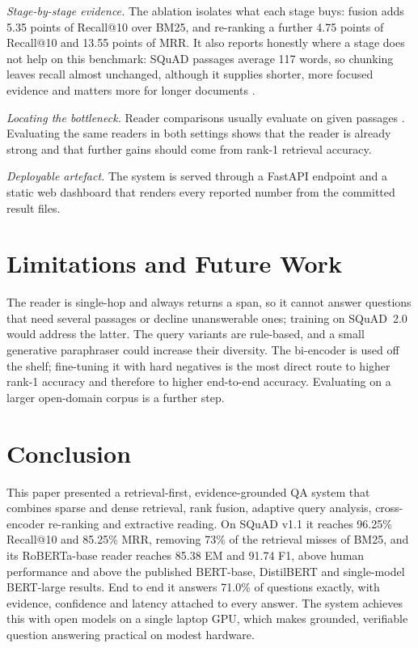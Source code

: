 \documentclass[conference]{IEEEtran}
\begin{document}
\emph{Stage-by-stage evidence.} The ablation isolates what each stage buys: fusion adds 5.35
points of Recall@10 over BM25, and re-ranking a further 4.75 points of Recall@10 and 13.55 points
of MRR. It also reports honestly where a stage does not help on this benchmark: SQuAD passages
average 117 words, so chunking leaves recall almost unchanged, although it supplies shorter,
more focused evidence and matters more for longer documents \cite{dang2021,tan2025}.

\emph{Locating the bottleneck.} Reader comparisons usually evaluate on given passages
\cite{sinthusha2025}. Evaluating the same readers in both settings shows that the reader is
already strong and that further gains should come from rank-1 retrieval accuracy.

\emph{Deployable artefact.} The system is served through a FastAPI endpoint and a static web
dashboard that renders every reported number from the committed result files.

\section{Limitations and Future Work}

The reader is single-hop and always returns a span, so it cannot answer questions that need
several passages or decline unanswerable ones; training on SQuAD~2.0 would address the latter.
The query variants are rule-based, and a small generative paraphraser could increase their
diversity. The bi-encoder is used off the shelf; fine-tuning it with hard negatives
\cite{choi2021,karpukhin2020} is the most direct route to higher rank-1 accuracy and therefore to
higher end-to-end accuracy. Evaluating on a larger open-domain corpus is a further step.

\section{Conclusion}

This paper presented a retrieval-first, evidence-grounded QA system that combines sparse and
dense retrieval, rank fusion, adaptive query analysis, cross-encoder re-ranking and extractive
reading. On SQuAD v1.1 it reaches 96.25\% Recall@10 and 85.25\% MRR, removing 73\% of the
retrieval misses of BM25, and its RoBERTa-base reader reaches 85.38 EM and 91.74 F1, above human
performance and above the published BERT-base, DistilBERT and single-model BERT-large results.
End to end it answers 71.0\% of questions exactly, with evidence, confidence and latency
attached to every answer. The system achieves this with open models on a single laptop GPU,
which makes grounded, verifiable question answering practical on modest hardware.



\end{document}
